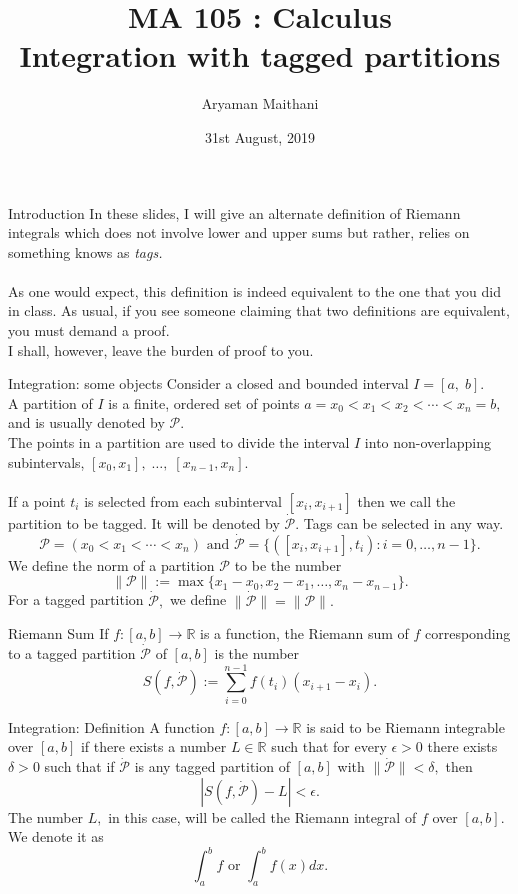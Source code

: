 \documentclass[handout, aspectratio=169]{beamer}
\title{MA 105 : Calculus\\ Integration with tagged partitions}  %
\author{Aryaman Maithani}
\date[31-08-2019]{31st August, 2019}               %
\institute[IITB]{IIT Bombay}
\begin{document}
\begin{frame}
	\titlepage
\end{frame}
\begin{frame}{Introduction}
	In these slides, I will give an alternate definition of Riemann integrals which does not involve lower and upper sums but rather, relies on something knows as \emph{tags.}\\~\\
	As one would expect, this definition is indeed equivalent to the one that you did in class. As usual, if you see someone claiming that two definitions are equivalent, you must demand a proof.\\
	I shall, however, leave the burden of proof to you.
\end{frame}
\begin{frame}{Integration: some objects}
	Consider a closed and bounded interval $I = [a,\;b].$\\
	A {\color[rgb]{1, 1, 1} partition} of $I$ is a finite, ordered set of points $a = x_0 < x_1 < x_2 < \cdots < x_n = b,$ and is usually denoted by $\mathcal{P}.$\\
	The points in a partition are used to divide the interval $I$ into non-overlapping subintervals, $[x_0, x_1],\;\ldots,\;[x_{n-1}, x_n].$\\~\\
	If a point $t_i$ is selected from each subinterval $[x_{i}, x_{i+1}]$ then we call the partition to be {\color[rgb]{1, 1, 1} tagged}. It will be denoted by $\dot{\mathcal{P}}.$ Tags can be selected in any way.
	\[\mathcal{P} = (x_0 < x_1 < \cdots < x_n) \text{ and } \dot{\mathcal{P}} = \{([x_i, x_{i+1}], t_i) : i = 0, \ldots, n-1\}.\]
	We define the {\color[rgb]{1, 1, 1} norm} of a partition $\mathcal{P}$ to be the number
	\[\|\mathcal{P}\| := \max\{x_1 - x_0, x_2 - x_1, \ldots, x_n - x_{n-1}\}.\]
	For a tagged partition $\dot{\mathcal{P}},$ we define $\|\dot{\mathcal{P}}\| = \|\mathcal{P}\|.$
	
\end{frame}
\begin{frame}{Riemann Sum}
	If $f:[a, b] \to \mathbb{R}$ is a function, the {\color[rgb]{1, 1, 1} Riemann sum} of $f$ corresponding to a tagged partition $\dot{\mathcal{P}}$ of $[a, b]$ is the number
	\[S(f, \dot{\mathcal{P}}) := \sum_{i=0}^{n-1}f(t_i)\left(x_{i+1} - x_i\right).\]
\end{frame}
\begin{frame}{Integration: Definition}
	A function $f:[a, b] \to \mathbb{R}$ is said to be {\color[rgb]{1, 1, 1} Riemann integrable} over $[a, b]$ if there exists a number $L \in \mathbb{R}$ such that for every $\epsilon > 0$ there exists $\delta > 0$ such that if $\dot{\mathcal{P}}$ is any tagged partition of $[a, b]$ with $\|\dot{\mathcal{P}}\| < \delta,$ then
	\[|S(f, \dot{\mathcal{P}}) - L| < \epsilon.\]
	The number $L,$ in this case, will be called the {\color[rgb]{1, 1, 1} Riemann integral} of $f$ over $[a, b].$ We denote it as 
	\[\int_{a}^{b} f \text{ or } \int_a^b f(x) dx.\]
\end{frame}
\end{document}
